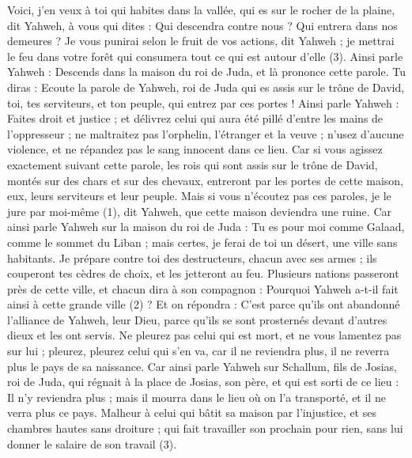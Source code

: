 \begin{multicols}{2}
Voici, j'en veux à toi qui habites dans la vallée, qui es sur le rocher de la plaine, dit Yahweh, à vous qui dites : Qui descendra contre nous ? Qui entrera dans nos demeures ?
Je vous punirai selon le fruit de vos actions, dit Yahweh ; je mettrai le feu dans votre forêt qui consumera tout ce qui est autour d'elle\FTNT{} (3).
\VerseOne{}Ainsi parle Yahweh : Descends dans la maison du roi de Juda, et là prononce cette parole.
Tu diras : Ecoute la parole de Yahweh, roi de Juda qui es assis sur le trône de David, toi, tes serviteurs, et ton peuple, qui entrez par ces portes !
Ainsi parle Yahweh : Faites droit et justice ; et délivrez celui qui aura été pillé d'entre les mains de l’oppresseur ; ne maltraitez pas l'orphelin, l'étranger et la veuve ; n'usez d'aucune violence, et ne répandez pas le sang innocent dans ce lieu.
Car si vous agissez exactement suivant cette parole, les rois qui sont assis sur le trône de David, montés sur des chars et sur des chevaux, entreront par les portes de cette maison, eux, leurs serviteurs et leur peuple.
Mais si vous n'écoutez pas ces paroles, je le jure par moi-même\FTNT{} (1), dit Yahweh, que cette maison deviendra une ruine.
Car ainsi parle Yahweh sur la maison du roi de Juda : Tu es pour moi comme Galaad, comme le sommet du Liban ; mais certes, je ferai de toi un désert, une ville sans habitants.
Je prépare contre toi des destructeurs, chacun avec ses armes ; ils couperont tes cèdres de choix, et les jetteront au feu.
Plusieurs nations passeront près de cette ville, et chacun dira à son compagnon : Pourquoi Yahweh a-t-il fait ainsi à cette grande ville\FTNT{} (2) ?
Et on répondra : C'est parce qu'ils ont abandonné l'alliance de Yahweh, leur Dieu, parce qu'ils se sont prosternés devant d'autres dieux et les ont servis.
Ne pleurez pas celui qui est mort, et ne vous lamentez pas sur lui ; pleurez, pleurez celui qui s'en va, car il ne reviendra plus, il ne reverra plus le pays de sa naissance.
Car ainsi parle Yahweh sur Schallum, fils de Josias, roi de Juda, qui régnait à la place de Josias, son père, et qui est sorti de ce lieu : Il n'y reviendra plus ;
mais il mourra dans le lieu où on l'a transporté, et il ne verra plus ce pays.
Malheur à celui qui bâtit sa maison par l'injustice, et ses chambres hautes sans droiture ; qui fait travailler son prochain pour rien, sans lui donner le salaire de son travail\FTNT{} (3).

\end{multicols}

